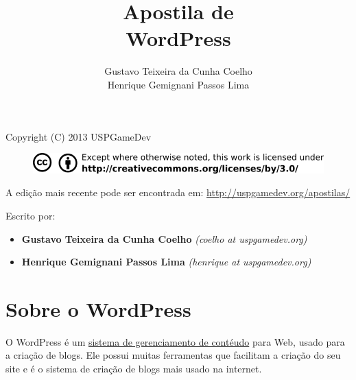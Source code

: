 \documentclass[12pt,onecolumn]{article}
\begin{document}
\begin{titlepage}

	\title{
		\bf
		\LARGE Apostila de  \\
		\Huge  WordPress
	}

	\author{Gustavo Teixeira da Cunha Coelho \\ Henrique Gemignani Passos Lima}

	\maketitle

	\thispagestyle{empty}

	\vfill
	

\end{titlepage}

	\thispagestyle{empty}

\begin{center}
  Copyright (C) 2013 USPGameDev
\end{center}
\begin{figure}[ht]
  \centering
  \includegraphics[width=\textwidth]{../CC-BY.png}
\end{figure}

\vfill

\begin{center}
A edição mais recente pode ser encontrada em:
\url{http://uspgamedev.org/apostilas/}
\end{center}

\vfill

Escrito por:
\begin{itemize}
  \item \textbf{Gustavo Teixeira da Cunha Coelho} \textit{(coelho at uspgamedev.org)}
  \item \textbf{Henrique Gemignani Passos Lima} \textit{(henrique at uspgamedev.org)}
\end{itemize}

\clearpage

\tableofcontents

\clearpage

\section{Sobre o WordPress}
	O WordPress é um \href{http://pt.wikipedia.org/wiki/Sistema_de_gerenciamento_de_conte%C3%BAdo}{
	sistema de gerenciamento de contéudo} para Web, usado para a criação de blogs. Ele possui muitas 
	ferramentas que facilitam a criação do seu site e é o sistema de criação de blogs mais usado na internet.
\end{document}
